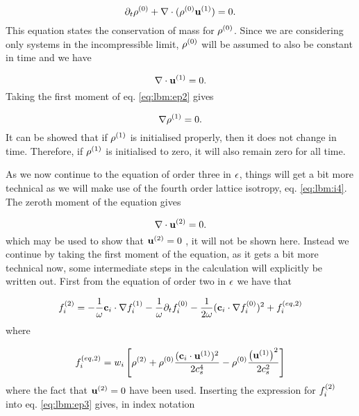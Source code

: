 \begin{equation}
\partial_t \rho^{(0)} + \nabla \cdot (\rho^{(0)} \mathbf{u}^{(1)}) = 0.
\end{equation}
This equation states the conservation of mass for $\rho^{(0)}$. Since
we are considering only systems in the incompressible limit,
$\rho^{(0)}$ will be assumed to also be constant in time and we have

\begin{equation}\label{eq:lbm:ns_nodivu}
\nabla \cdot \mathbf{u}^{(1)} = 0.
\end{equation}
Taking the first moment of eq. \ref{eq:lbm:ep2} gives 

\begin{equation}\label{eq:lbm:ns_rhoe1}
\nabla \rho^{(1)} = 0.
\end{equation}
It can be showed \cite{junk-asym} that if $\rho^{(1)}$ is initialised
properly, then it does not change in time. Therefore, if $\rho^{(1)}$ is
initialised to zero, it will also remain zero for all time.

As we now continue to the equation of order three in $\epsilon$, things
will get a bit more technical as we will make use of the fourth order lattice isotropy, eq. \eqref{eq:lbm:i4}. The zeroth moment of the equation gives

\begin{equation}
\nabla \cdot \mathbf{u}^{(2)} = 0.
\end{equation}
which may be used to show that $\mathbf{u}^{(2)} = 0$ \cite{junk-asym}, it will
not be shown here. Instead we continue by taking the first moment of
the equation, as it gets a bit more technical now, some intermediate
steps in the calculation will explicitly be written out. First from
the equation of order two in $\epsilon$ we have that

\begin{equation}
f_i^{(2)} = -\frac{1}{\omega} \mathbf{c}_i\cdot\nabla f_i^{(1)} - \frac{1}{\omega} \partial_t
f_i^{(0)} - \frac{1}{2\omega} (\mathbf{c}_i\cdot\nabla f_i^{(0)})^2 + f_i^{(eq, 2)}
\end{equation}
where

\begin{equation}
f_i^{(eq, 2)} = w_i \left[ \rho^{(2)} + \rho^{(0)} \frac{(\mathbf{c}_i \cdot
    \mathbf{u}^{(1)})^2}{2c_s^4} - \rho^{(0)} \frac{\left(\mathbf{u}^{(1)}\right)^2}{2c_s^2} \right]
\end{equation}
where the fact that $\mathbf{u}^{(2)} = 0$ have been used. Inserting the
expression for $f_i^{(2)}$ into eq. \eqref{eq:lbm:ep3} gives, in index
notation


